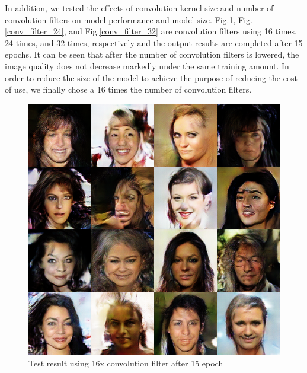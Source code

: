 In addition, we tested the effects of convolution kernel size and number of convolution filters on model performance and model size.
Fig.\ref{conv_filter_16}, Fig.\ref{conv_filter_24}, and Fig.\ref{conv_filter_32} are convolution filters using 16 times, 24 times, and 32 times, respectively and the output results are completed after 15 epochs.
It can be seen that after the number of convolution filters is lowered, the image quality does not decrease markedly under the same training amount.
In order to reduce the size of the model to achieve the purpose of reducing the cost of use, we finally chose a 16 times the number of convolution filters.

\begin{figure}
    \begin{minipage}[t]{0.48\linewidth}
        \centering
        \includegraphics[width=\textwidth]{figures/result_conv_filter_16.png}
        \caption{Test result using 16x convolution filter after 15 epoch}
        \label{conv_filter_16}
    \end{minipage}
        \hfill
    \begin{minipage}[t]{0.48\linewidth}
        \centering

\end{minipage}
\end{figure}

